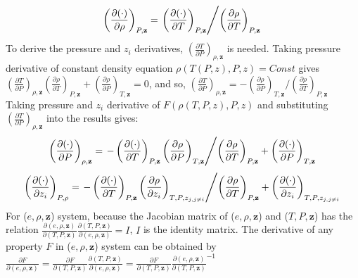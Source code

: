 \begin{align}
	\left(\frac{\partial (\cdot)}{\partial \rho}\right)_{P,\mathbf{z}} =\left. \left(\frac{\partial (\cdot)}{\partial T}\right)_{P,\mathbf{z}} \middle/ \left(\frac{\partial \rho}{\partial T}\right)_{P,\mathbf{z}}\right.
\end{align}
To derive the pressure and $z_i$ derivatives, $\left(\frac{\partial T}{\partial P}\right)_{\rho,\mathbf{z}}$ is needed. Taking pressure derivative of constant density equation $\rho(T(P,z),P,z)=Const$ gives $\left(\frac{\partial T} {\partial P}\right)_{\rho,\mathbf{z}}\left(\frac{\partial \rho}{\partial T}\right)_{P,\mathbf{z}}+ \left(\frac{\partial \rho}{\partial P}\right)_{T,\mathbf{z}}=0$, and so, $\left(\frac{\partial T}{\partial P}\right)_{\rho,\mathbf{z}} = - \left(\frac{\partial \rho}{\partial P}\right)_{T,\mathbf{z}}/ \left(\frac{\partial \rho}{\partial T}\right)_{P,\mathbf{z}}$
Taking pressure and $z_i$ derivative of $F(\rho(T,P,z),P,z)$ and substituting $\left(\frac{\partial T}{\partial P}\right)_{\rho,\mathbf{z}}$ into the results gives:
\begin{align}
	\left(\frac{\partial (\cdot)}{\partial P}\right)_{\rho,\mathbf{z}} = \left.-\left(\frac{\partial (\cdot)}{\partial T}\right)_{P,\mathbf{z}} \left(\frac{\partial \rho}{\partial P}\right)_{T,\mathbf{z}}\middle/ \left(\frac{\partial \rho}{\partial T}\right)_{P,\mathbf{z}}+
	\left(\frac{\partial (\cdot)}{\partial P}\right)_{T,\mathbf{z}}\right.
\end{align}
\begin{align}
	\left(\frac{\partial (\cdot)}{\partial z_i}\right)_{P,\rho} = \left.-\left(\frac{\partial (\cdot)}{\partial T}\right)_{P,\mathbf{z}} \left(\frac{\partial \rho}{\partial z_i}\right)_{T,P,z_{j, j \neq i}}\middle/ \left(\frac{\partial \rho}{\partial T}\right)_{P,\mathbf{z}}+
	\left(\frac{\partial (\cdot)}{\partial z_i}\right)_{T,P,z_{j, j \neq i}}\right.
\end{align}
For ($e,\rho,\mathbf{z}$) system, because the Jacobian matrix of ($e,\rho,\mathbf{z}$) and ($T,P,\mathbf{z}$) has the relation $\frac{\partial (e,\rho,\mathbf{z})}{\partial(T,P,\mathbf{z})}\frac{\partial(T,P,\mathbf{z})}{\partial (e,\rho,\mathbf{z})} = I$, $I$ is the identity matrix. The derivative of any property $F$ in  ($e,\rho,\mathbf{z}$) system can be obtained by $\frac{\partial F}{\partial (e,\rho,\mathbf{z})}=\frac{\partial F}{\partial(T,P,\mathbf{z})}\frac{\partial(T,P,\mathbf{z})}{\partial (e,\rho,\mathbf{z})} = \frac{\partial F}{\partial(T,P,\mathbf{z})} \frac{\partial (e,\rho,\mathbf{z})}{\partial(T,P,\mathbf{z})}^{-1}$
